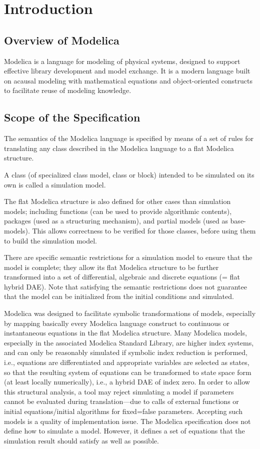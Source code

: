 \chapter{Introduction}\label{introduction1}
\section{Overview of Modelica}\label{overview-of-modelica}
Modelica is a language for modeling of physical systems, designed to
support effective library development and model exchange. It is a modern
language built on acausal modeling with mathematical equations and
object-oriented constructs to facilitate reuse of modeling knowledge.

\section{Scope of the Specification}\label{scope-of-the-specification}

The semantics of the Modelica language is specified by means of a set of
rules for translating any class described in the Modelica language to a
flat Modelica structure.

A class (of specialized class model, class or block) intended to be
simulated on its own is called a simulation model.

The flat Modelica structure is also defined for other cases than
simulation models; including functions (can be used to provide
algorithmic contents), packages (used as a structuring mechanism), and
partial models (used as base-models). This allows correctness to be
verified for those classes, before using them to build the simulation
model.

There are specific semantic restrictions for a simulation model to
ensure that the model is complete; they allow its flat Modelica
structure to be further transformed into a set of differential,
algebraic and discrete equations (= flat hybrid DAE). Note that
satisfying the semantic restrictions does not guarantee that the model
can be initialized from the initial conditions and simulated.

Modelica was designed to facilitate symbolic transformations of models,
especially by mapping basically every Modelica language construct to
continuous or instantaneous equations in the flat Modelica structure.
Many Modelica models, especially in the associated Modelica Standard
Library, are higher index systems, and can only be reasonably simulated
if symbolic index reduction is performed, i.e., equations are
differentiated and appropriate variables are selected as states, so that
the resulting system of equations can be transformed to state space form
(at least locally numerically), i.e., a hybrid DAE of index zero. In
order to allow this structural analysis, a tool may reject simulating a
model if parameters cannot be evaluated during translation---due to
calls of external functions or initial equations/initial algorithms for
fixed=false parameters. Accepting such models is a quality of
implementation issue. The Modelica specification does not define how to
simulate a model. However, it defines a set of equations that the
simulation result should satisfy as well as possible.

